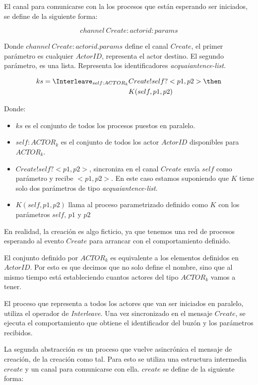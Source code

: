 El canal para comunicarse con la los procesos que están esperando ser iniciados, se define de la siguiente forma:

\[
channel\ Create:actorid:params
\]

Donde $channel\ Create:actorid.params$ define el canal $Create$, el primer parámetro es cualquier $ActorID$, representa el actor destino. El segundo parámetro, es una lista. Representa los identificadores \textit{acquaiantence-list}. 

\begin{align*}
ks = \Interleave_{ self : ACTOR_k } & Create!self?<p1, p2> \then \\
& K(self, p1, p2) 
\end{align*}

Donde:

\begin{itemize}
 \item $ks$ es el conjunto de todos los procesos puestos en paralelo.
 \item $self : ACTOR_k$ es el conjunto de todos los actor $ActorID$ disponibles para $ACTOR_k$.
 \item $Create!self?<p1, p2>$, sincroniza en el canal $Create$ envía $self$ como parámetro y recibe $<p1, p2>$. En este caso estamos suponiendo que $K$ tiene solo dos parámetros de tipo \textit{acquaiantence-list}.
 \item $K(self, p1, p2)$ llama al proceso parametrizado definido como $K$ con los parámetros $self$, $p1$ y $p2$
\end{itemize}

En realidad, la creación es algo ficticio, ya que tenemos una red de procesos \CSP esperando al evento $Create$ para arrancar con el comportamiento definido. 

El conjunto definido por $ACTOR_k$ es equivalente a los elementos definidos en $ActorID$. Por esto es que decimos que no solo define el nombre, sino que al mismo tiempo está estableciendo cuantos actores del tipo $ACTOR_k$ vamos a tener.

El proceso que representa a todos los actores que van ser iniciados en paralelo, utiliza el operador de \textit{Interleave}. Una vez sincronizado en el mensaje $Create$, se ejecuta el comportamiento que obtiene el identificador del buzón y los parámetros recibidos. 

La segunda abstracción es un proceso que vuelve asincrónica el mensaje de creación, de la creación como tal. Para esto se utiliza una estructura intermedia $create$ y un canal para comunicarse con ella. $create$ se define de la siguiente forma: 

